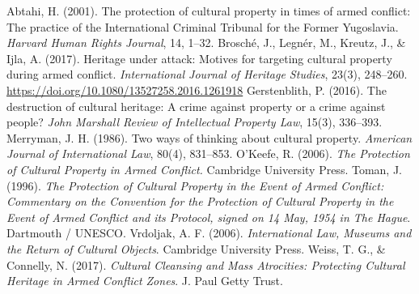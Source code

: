 
\begin{referencelist}
   Abtahi, H. (2001). The protection of cultural property in times of armed conflict: The practice of the International Criminal Tribunal for the Former Yugoslavia. \emph{Harvard Human Rights Journal}, 14, 1–32.
   Brosché, J., Legnér, M., Kreutz, J., \& Ijla, A. (2017). Heritage under attack: Motives for targeting cultural property during armed conflict. \emph{International Journal of Heritage Studies}, 23(3), 248–260. \url{https://doi.org/10.1080/13527258.2016.1261918}
   Gerstenblith, P. (2016). The destruction of cultural heritage: A crime against property or a crime against people? \emph{John Marshall Review of Intellectual Property Law}, 15(3), 336–393.
   Merryman, J. H. (1986). Two ways of thinking about cultural property. \emph{American Journal of International Law}, 80(4), 831–853.
   O'Keefe, R. (2006). \emph{The Protection of Cultural Property in Armed Conflict.} Cambridge University Press.
   Toman, J. (1996). \emph{The Protection of Cultural Property in the Event of Armed Conflict: Commentary on the Convention for the Protection of Cultural Property in the Event of Armed Conflict and its Protocol, signed on 14 May, 1954 in The Hague}. Dartmouth / UNESCO.
   Vrdoljak, A. F. (2006). \emph{International Law, Museums and the Return of Cultural Objects}. Cambridge University Press.
   Weiss, T. G., \& Connelly, N. (2017). \emph{Cultural Cleansing and Mass Atrocities: Protecting Cultural Heritage in Armed Conflict Zones}. J. Paul Getty Trust.
\end{referencelist}
